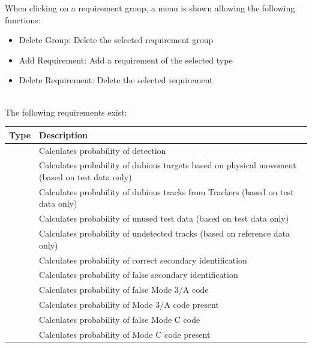 When clicking on a requirement group, a menu is shown allowing the following functions:
\begin{itemize}  
\item Delete Group: Delete the selected requirement group
\item Add Requirement: Add a requirement of the selected type
\item Delete Requirement: Delete the selected requirement
\end{itemize}
\ \\

The following requirements exist:

\begin{center}
 \begin{table}[H]
  \begin{tabularx}{\textwidth}{ | l | X |  }
    \hline
    \textbf{Type} & \textbf{Description} \\ \hline
    \nameref{sec:eval_req_detection} & Calculates probability of detection  \\ \hline
    \nameref{sec:eval_req_dubious_targets} & Calculates probability of dubious targets based on physical movement (based on test data only) \\ \hline
    \nameref{sec:eval_req_dubious_tracks} & Calculates probability of dubious tracks from Trackers (based on test data only) \\ \hline
    \nameref{sec:eval_req_extra_data} & Calculates probability of unused test data (based on test data only) \\ \hline
    \nameref{sec:eval_req_extra_track} & Calculates probability of undetected tracks (based on reference data only) \\ \hline
    \nameref{sec:eval_req_id_correct} & Calculates probability of correct secondary identification \\ \hline
    \nameref{sec:eval_req_id_false} & Calculates probability of false secondary identification \\ \hline
    \nameref{sec:eval_req_m3a_false} & Calculates probability of false Mode 3/A code \\ \hline
    \nameref{sec:eval_req_m3a_present} & Calculates probability of Mode 3/A code present \\ \hline
    \nameref{sec:eval_req_mc_false} & Calculates probability of false Mode C code \\ \hline
    \nameref{sec:eval_req_mc_present} & Calculates probability of Mode C code present \\ \hline

\end{tabularx}
\end{table}
\end{center}
